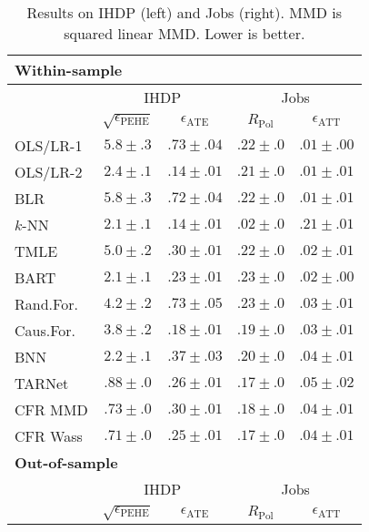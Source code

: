 \documentclass{article}
\def \epehe{\epsilon_{\text{PEHE}}}
\def \eate{\epsilon_{\text{ATE}}}
\def \eatt{\epsilon_{\text{ATT}}}
\def\tarnet{{TARNet}}
\begin{document}
\begin{table}[t!]
  \caption{\label{tbl:ihdp_jobs_results}Results on IHDP (left) and Jobs (right). MMD is squared linear MMD. Lower is better. \vspace{-1.3em}}
  \begin{center}
    \begin{small}
      \begin{sc}
      \begin{tabular}{l|cc|cc}
        \multicolumn{5}{l}{\bf{Within-sample}} \\
        \hline
        & \multicolumn{2}{c|}{IHDP} & \multicolumn{2}{c}{Jobs} \\
        & $\sqrt{\epehe}$ & $\eate$ & $R_{\text{Pol}}$  & $\eatt$\\
        \hline
        OLS/LR-1 & $5.8 \pm .3$ & $.73 \pm .04$ & $.22 \pm .0$ & $.01 \pm .00$ \\
        OLS/LR-2  & $2.4 \pm .1$ & $.14 \pm .01$ & $.21 \pm .0$ & $.01 \pm .01$ \\
        BLR  & $5.8 \pm .3$ & $.72 \pm .04$ & $.22 \pm .0$ & $.01 \pm .01$ \\
        $k$-NN & $2.1 \pm .1$ & $.14 \pm .01$ & $.02 \pm .0$ & $.21 \pm .01$ \\
		    TMLE  & $5.0 \pm .2$ & $.30 \pm .01$ & $.22 \pm .0$ & $.02 \pm .01$ \\
BART  & $2.1 \pm .1$ & $.23 \pm .01$ & $.23 \pm .0$ & $.02 \pm .00$ \\
        Rand.For.  & $4.2 \pm .2$ & $.73 \pm .05$ & $.23 \pm .0$ & $.03 \pm .01$ \\
        Caus.For.  & $3.8 \pm .2$ & $.18 \pm .01$ & $.19 \pm .0$ & $.03 \pm .01$ \\
        BNN  & $2.2 \pm .1$ & $.37 \pm .03$ & $.20 \pm .0$ & $.04 \pm .01$ \\
\tarnet{}  & $.88 \pm .0$ & $.26 \pm .01$ & $.17 \pm .0$ & $.05 \pm .02$ \\
        CFR MMD & $.73 \pm .0$ & $.30 \pm .01$ & $.18 \pm .0$ & $.04 \pm .01$ \\
        CFR Wass & $.71 \pm .0$ & $.25 \pm .01$ & $.17 \pm .0$ & $.04 \pm .01$ \\
        \hline
        \multicolumn{5}{l}{\bf{Out-of-sample}} \\
        \hline
        & \multicolumn{2}{c|}{IHDP} & \multicolumn{2}{c}{Jobs} \\
        & $\sqrt{\epehe}$ & $\eate$ & $R_{\text{Pol}}$  & $\eatt$\\
        \hline

\end{tabular}
\end{sc}
\end{small}
\end{center}
\end{table}
\end{document}
